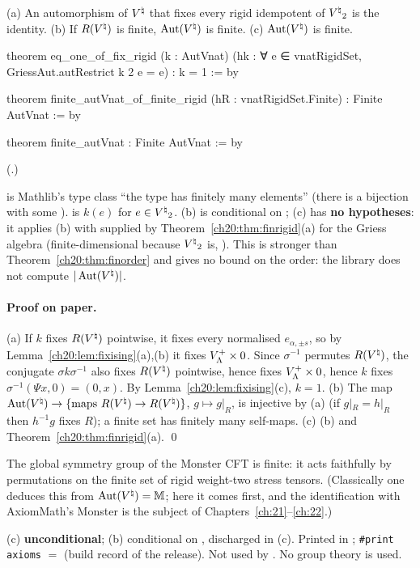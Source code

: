 \begin{theorem}\label{ch20:thm:finite}
(a) An automorphism of ${V^{\natural}}$ that fixes every rigid idempotent of ${V^{\natural}}_2$ is the identity.  (b) If $R({V^{\natural}})$ is finite,
$\operatorname{Aut}({V^{\natural}})$ is finite.  (c) $\operatorname{Aut}({V^{\natural}})$ is finite.
\end{theorem}
\begin{leancode}
theorem eq_one_of_fix_rigid (k : AutVnat)
    (hk : ∀ e ∈ vnatRigidSet, GriessAut.autRestrict k 2 e = e) : k = 1 := by

theorem finite_autVnat_of_finite_rigid (hR : vnatRigidSet.Finite) : Finite AutVnat := by

theorem finite_autVnat : Finite AutVnat := by
\end{leancode}
(.)
\begin{dictionary}
 is Mathlib's type class ``the type  has finitely many elements'' (there is a bijection
with some ).   is $k(e)$ for $e\in{V^{\natural}}_2$.  (b) is conditional on ;
(c) has \textbf{no hypotheses}: it applies (b) with  supplied by Theorem~\ref{ch20:thm:finrigid}(a) for the Griess
algebra (finite-dimensional because ${V^{\natural}}_2$ is, ).  This is stronger than
Theorem~\ref{ch20:thm:finorder} and gives no bound on the order: the library does not compute $|\operatorname{Aut}({V^{\natural}})|$.
\end{dictionary}
\paragraph{Proof on paper.}  (a) If $k$ fixes $R({V^{\natural}})$ pointwise, it fixes every normalised $e_{\alpha,\pm s}$, so by
Lemma~\ref{ch20:lem:fixising}(a),(b) it fixes $V_{\Lambda}^{+}\times0$.  Since $\sigma^{-1}$ permutes $R({V^{\natural}})$, the conjugate
$\sigma k\sigma^{-1}$ also fixes $R({V^{\natural}})$ pointwise, hence fixes $V_{\Lambda}^{+}\times0$, hence $k$ fixes $\sigma^{-1}(\Psi x,0)=(0,x)$.
By Lemma~\ref{ch20:lem:fixising}(c), $k=1$.  (b) The map $\operatorname{Aut}({V^{\natural}})\to\{\text{maps }R({V^{\natural}})\to R({V^{\natural}})\}$, $g\mapsto g|_{R}$, is
injective by (a) (if $g|_R=h|_R$ then $h^{-1}g$ fixes $R$); a finite set has finitely many self-maps.  (c) (b) and
Theorem~\ref{ch20:thm:finrigid}(a). \qed
\begin{physics}
The global symmetry group of the Monster CFT is finite: it acts faithfully by permutations on the finite set of rigid
weight-two stress tensors.  (Classically one deduces this from $\operatorname{Aut}({V^{\natural}})=\mathbb M$; here it comes first, and the
identification with AxiomMath's Monster is the subject of Chapters~\ref{ch:21}--\ref{ch:22}.)
\end{physics}
\begin{status}
(c) \textbf{unconditional}; (b) conditional on , discharged in (c).  Printed in
; \texttt{\#print axioms} $=$ 
(build record of the release).  Not used by .  No group
theory is used.
\end{status}

